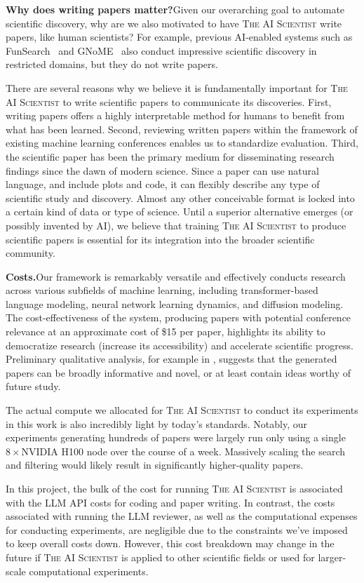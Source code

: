\documentclass[11pt, a4paper]{include/gdm_format}
\newcommand{\ouralgo}{\textsc{The AI Scientist}\xspace}
\begin{document}
\textbf{Why does writing papers matter?}\;Given our overarching goal to automate scientific discovery, why are we also motivated to have \ouralgo write papers, like human scientists? For example, previous AI-enabled systems such as FunSearch~\citep{romera2024mathematical} and GNoME~\citep{pyzer2022alphamaterials} also conduct impressive scientific discovery in restricted domains, but they do not write papers.

There are several reasons why we believe it is fundamentally important for \ouralgo to write scientific papers to communicate its discoveries.
First, writing papers offers a highly interpretable method for humans to benefit from what has been learned.
Second, reviewing written papers within the framework of existing machine learning conferences enables us to standardize evaluation.
%
%
Third, the scientific paper has been the primary medium for disseminating research findings since the dawn of modern science.
Since a paper can use natural language, and include plots and code, it can flexibly describe any type of scientific study and discovery.
Almost any other conceivable format is locked into a certain kind of data or type of science.
%
Until a superior alternative emerges (or possibly invented by AI), we believe that training \ouralgo to produce scientific papers is essential for its integration into the broader scientific community.

\textbf{Costs.}\;Our framework is remarkably versatile and effectively conducts research across various subfields of machine learning, including transformer-based language modeling, neural network learning dynamics, and diffusion modeling.
The cost-effectiveness of the system, producing papers with potential conference relevance at an approximate cost of \$15 per paper, highlights its ability to democratize research (increase its accessibility) and accelerate scientific progress.
Preliminary qualitative analysis, for example in , suggests that the generated papers can be broadly informative and novel, or at least contain ideas worthy of future study.

The actual compute we allocated for \ouralgo to conduct its experiments in this work is also incredibly light by today's standards.
Notably, our experiments generating hundreds of papers were largely run only using a single $8\times$NVIDIA H100 node over the course of a week.
Massively scaling the search and filtering would likely result in significantly higher-quality papers.

In this project, the bulk of the cost for running \ouralgo is associated with the LLM API costs for coding and paper writing. In contrast, the costs associated with running the LLM reviewer, as well as the computational expenses for conducting experiments, are negligible due to the constraints we've imposed to keep overall costs down. However, this cost breakdown may change in the future if \ouralgo is applied to other scientific fields or used for larger-scale computational experiments.
%
\end{document}
